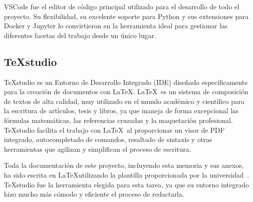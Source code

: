 VSCode fue el editor de código principal utilizado para el desarrollo de todo el proyecto. Su flexibilidad, su excelente soporte para Python y sus extensiones para Docker y Jupyter lo convirtieron en la herramienta ideal para gestionar las diferentes facetas del trabajo desde un único lugar.

\subsection{TeXstudio}


TeXstudio es un Entorno de Desarrollo Integrado (IDE) diseñado específicamente para la creación de documentos con \LaTeX. \LaTeX\ es un sistema de composición de textos de alta calidad, muy utilizado en el mundo académico y científico para la escritura de artículos, tesis y libros, ya que maneja de forma excepcional las fórmulas matemáticas, las referencias cruzadas y la maquetación profesional. TeXstudio facilita el trabajo con \LaTeX\ al proporcionar un visor de PDF integrado, autocompletado de comandos, resaltado de sintaxis y otras herramientas que agilizan y simplifican el proceso de escritura.

Toda la documentación de este proyecto, incluyendo esta memoria y sus anexos, ha sido escrita en \LaTeX utilizando la plantilla proporcionada por la universidad~\cite{UBU2024ubutfgm}. TeXstudio fue la herramienta elegida para esta tarea, ya que su entorno integrado hizo mucho más cómodo y eficiente el proceso de redactarla.
